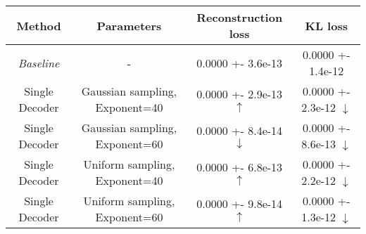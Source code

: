 \centering
\scriptsize
\begin{tabular}{||c|c|c|c||}
\hline
 Method & Parameters & Reconstruction loss & KL loss \\
\hline
\textit{Baseline} & - & 0.0000 +- 3.6e-13 & 0.0000 +- 1.4e-12 \\
\hline
Single Decoder & Gaussian sampling, Exponent=40 & 0.0000 +- 2.9e-13  $\uparrow$ & 0.0000 +- 2.3e-12  $\downarrow$ \\
\hline
Single Decoder & Gaussian sampling, Exponent=60 & 0.0000 +- 8.4e-14  $\downarrow$ & 0.0000 +- 8.6e-13  $\downarrow$ \\
\hline
Single Decoder & Uniform sampling, Exponent=40 & 0.0000 +- 6.8e-13  $\uparrow$ & 0.0000 +- 2.2e-12  $\downarrow$ \\
\hline
Single Decoder & Uniform sampling, Exponent=60 & 0.0000 +- 9.8e-14  $\uparrow$ & 0.0000 +- 1.3e-12  $\downarrow$ \\
\hline
\end{tabular}
